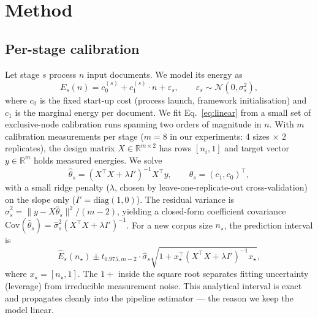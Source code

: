 \documentclass{article}
\begin{document}
\section{Method}

\subsection{Per-stage calibration}

\label{sec:calibration}

Let stage $s$ process $n$ input documents. We model its energy as
\begin{equation}
  E_s(n) = c_0^{(s)} + c_1^{(s)} \cdot n + \varepsilon_s,
  \qquad \varepsilon_s \sim \mathcal{N}(0, \sigma_s^2),
  \label{eq:linear}
\end{equation}
where $c_0$ is the fixed start-up cost (process launch, framework initialisation) and $c_1$ is the marginal energy per document. We fit Eq.~\eqref{eq:linear} from a small set of exclusive-node calibration runs spanning two orders of magnitude in $n$. With $m$ calibration measurements per stage ($m = 8$ in our experiments: 4 sizes $\times$ 2 replicates), the design matrix $X \in \mathbb{R}^{m \times 2}$ has rows $[n_i, 1]$ and target vector $y \in \mathbb{R}^m$ holds measured energies. We solve
\begin{equation}
  \hat{\theta}_s = (X^\top X + \lambda I')^{-1} X^\top y,
  \qquad \theta_s = (c_1, c_0)^\top,
  \label{eq:ridge}
\end{equation}
with a small ridge penalty ($\lambda$, chosen by leave-one-replicate-out cross-validation) on the slope only ($I' = \mathrm{diag}(1,0)$). The residual variance is $\hat{\sigma}_s^2 = \|y - X\hat{\theta}_s\|^2 / (m-2)$, yielding a closed-form coefficient covariance $\mathrm{Cov}(\hat{\theta}_s) = \hat{\sigma}_s^2 (X^\top X + \lambda I')^{-1}$. For a new corpus size $n_\star$, the prediction interval is
\begin{equation}
  \hat{E}_s(n_\star) \pm t_{0.975, m-2} \cdot \hat{\sigma}_s \sqrt{1 + x_\star^\top (X^\top X + \lambda I')^{-1} x_\star},
  \label{eq:predint}
\end{equation}
where $x_\star = [n_\star, 1]$. The $1+$ inside the square root separates fitting uncertainty (leverage) from irreducible measurement noise. This analytical interval is exact and propagates cleanly into the pipeline estimator --- the reason we keep the model linear.
\end{document}
